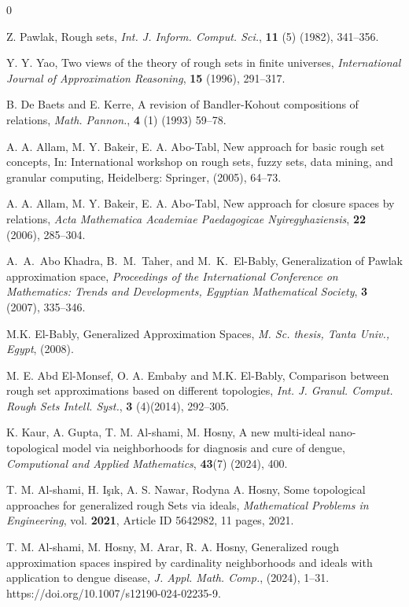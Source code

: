 \documentclass{article}
\theoremstyle{theorem}
\theoremstyle{definition}
\theoremstyle{remark}
\begin{document}
\begin{thebibliography}{0}

 Z. Pawlak, Rough sets, \emph{Int. J. Inform. Comput. Sci.}, \textbf{11} (5) (1982), 341--356.

 Y. Y. Yao, Two views of the theory of rough sets in finite universes, \emph{ International Journal of Approximation Reasoning}, \textbf{15} (1996), 291--317.

 B. De Baets and E. Kerre, A revision of Bandler-Kohout compositions of relations, \emph{ Math. Pannon.}, \textbf{4} (1) (1993) 59–78.

 A. A. Allam, M. Y. Bakeir, E. A. Abo-Tabl, New approach for basic rough set concepts, In: International workshop on rough sets, fuzzy sets, data mining, and granular computing, Heidelberg: Springer, (2005), 64--73.

 A. A. Allam, M. Y. Bakeir, E. A. Abo-Tabl, New approach for closure spaces by relations, \emph{Acta Mathematica Academiae Paedagogicae Nyiregyhaziensis}, \textbf{22} (2006), 285--304.

 A.~A.~Abo Khadra, B.~M.~Taher, and M.~K.~El-Bably, Generalization of Pawlak approximation space, \emph{Proceedings of the International Conference on Mathematics: Trends and Developments, Egyptian Mathematical Society}, \textbf{3} (2007), 335--346.

 M.K. El-Bably, Generalized Approximation Spaces, \emph{ M. Sc. thesis, Tanta Univ., Egypt}, (2008).


 M. E. Abd El-Monsef, O. A. Embaby and M.K. El-Bably, Comparison between rough set approximations based on different topologies, \emph{Int. J. Granul. Comput. Rough Sets Intell. Syst.}, \textbf{3} (4)(2014), 292--305.

 K. Kaur, A. Gupta, T. M. Al-shami, M. Hosny, A new multi-ideal nano-topological model via neighborhoods for diagnosis and cure of dengue, \emph{Computional and Applied Mathematics}, \textbf{43}(7) (2024), 400.

 T. M. Al-shami, H. Işık, A. S. Nawar, Rodyna A. Hosny, Some topological approaches for generalized rough Sets via ideals, \emph{Mathematical Problems in Engineering}, vol. \textbf{2021}, Article ID 5642982, 11 pages, 2021.

 T. M. Al-shami, M. Hosny, M. Arar, R. A. Hosny, Generalized rough approximation spaces inspired by cardinality neighborhoods and ideals with application to dengue disease, \emph{J. Appl. Math. Comp.}, (2024), 1–31. https://doi.org/10.1007/s12190-024-02235-9.


\end{thebibliography}
\end{document}
